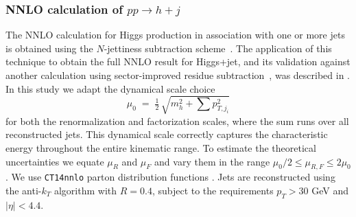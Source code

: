 \subsubsection{NNLO calculation of $pp\to h+j$}
\label{sec:hjetscomp:tools:fo:BFGLP}

The NNLO calculation for Higgs production in association with one or 
more jets is obtained using the $N$-jettiness subtraction 
scheme~\cite{Boughezal:2015dva,Gaunt:2015pea}.  The application of 
this technique to obtain the full NNLO result for Higgs+jet, and its 
validation against another calculation using sector-improved residue 
subtraction~\cite{Boughezal:2015dra}, was described in 
\cite{Boughezal:2015aha}.  In this study we adapt the dynamical scale choice
%
\begin{equation}\label{eq:bfglpScale}
  \mu_0\;=\;\tfrac{1}{2}\,\sqrt{m_{h}^2+\sum p_{T,j_i}^2}
\end{equation}
%
for both the renormalization and factorization scales, where the sum 
runs over all reconstructed jets.  This dynamical scale correctly 
captures the characteristic energy throughout the entire kinematic 
range.  To estimate the theoretical uncertainties we equate $\mu_R$ 
and $\mu_F$ and vary them in the range $\mu_0/2 \leq \mu_{R,F} \leq 2 \mu_0$.  
We use \texttt{CT14nnlo} parton distribution functions 
\cite{Dulat:2015mca}.  Jets are reconstructed using the anti-$k_T$ algorithm 
with $R=0.4$, subject to the requirements $p_T>30$ GeV and $|\eta|<4.4$.
